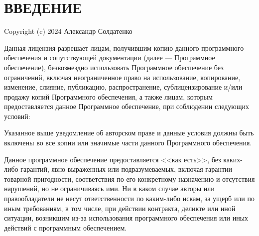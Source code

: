\chapter*{ВВЕДЕНИЕ}
Copyright (c) 2024 Александр Солдатенко

Данная лицензия разрешает лицам, получившим копию данного программного обеспечения и сопутствующей документации (далее — Программное обеспечение), безвозмездно использовать Программное обеспечение без ограничений, включая неограниченное право на использование, копирование, изменение, слияние, публикацию, распространение, сублицензирование и/или продажу копий Программного обеспечения, а также лицам, которым предоставляется данное Программное обеспечение, при соблюдении следующих условий:

Указанное выше уведомление об авторском праве и данные условия должны быть включены во все копии или значимые части данного Программного обеспечения.

Данное программное обеспечение предоставляется <<как есть>>, без каких-либо гарантий, явно выраженных или подразумеваемых, включая гарантии товарной пригодности, соответствия по его конкретному назначению и отсутствия нарушений, но не ограничиваясь ими. Ни в каком случае авторы или правообладатели не несут ответственности по каким-либо искам, за ущерб или по иным требованиям, в том числе, при действии контракта, деликте или иной ситуации, возникшим из-за использования программного обеспечения или иных действий с программным обеспечением. 

